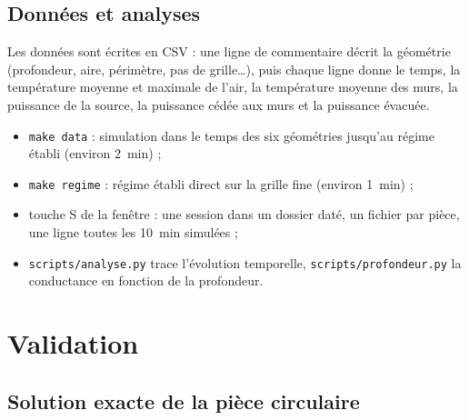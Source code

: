 \documentclass[11pt,a4paper]{article}
\theoremstyle{definition}
\theoremstyle{remark}
\begin{document}
\subsection{Données et analyses}

Les données sont écrites en CSV : une ligne de commentaire décrit la géométrie
(profondeur, aire, périmètre, pas de grille\ldots), puis chaque ligne donne le temps,
la température moyenne et maximale de l'air, la température moyenne des murs, la
puissance de la source, la puissance cédée aux murs et la puissance évacuée.
\begin{itemize}
  \item \texttt{make data} : simulation dans le temps des six géométries jusqu'au
  régime établi (environ \qty{2}{\minute}) ;
  \item \texttt{make regime} : régime établi direct sur la grille fine (environ
  \qty{1}{\minute}) ;
  \item touche S de la fenêtre : une session dans un dossier daté, un fichier par
  pièce, une ligne toutes les \qty{10}{\minute} simulées ;
  \item \texttt{scripts/analyse.py} trace l'évolution temporelle,
  \texttt{scripts/profondeur.py} la conductance en fonction de la profondeur.
\end{itemize}

\section{Validation}\label{sec-validation}

\subsection{Solution exacte de la pièce circulaire}
\end{document}
